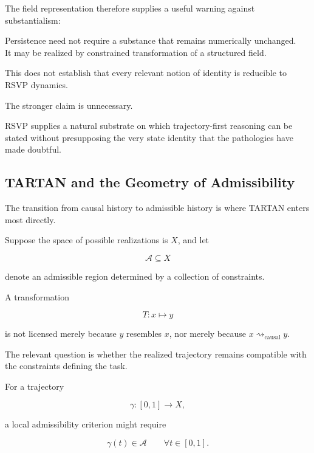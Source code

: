 \documentclass[
  11pt,
  a4paper,
  DIV=12,
  BCOR=0mm,
  parskip=half-
]{scrartcl}
\newcommand{\leadcausal}{%
  \mathrel{\rightsquigarrow_{\mathrm{causal}}}%
}
\theoremstyle{definition}
\theoremstyle{plain}
\theoremstyle{remark}
\begin{document}
The field representation therefore supplies a useful warning against
substantialism:

\begin{held}
\centering
Persistence need not require a substance that remains numerically unchanged.\\[3pt]
It may be realized by constrained transformation of a structured field.
\end{held}

This does not establish that every relevant notion of identity is reducible to
RSVP dynamics.

The stronger claim is unnecessary.

RSVP supplies a natural substrate on which trajectory-first reasoning can be
stated without presupposing the very state identity that the pathologies have
made doubtful.


\subsection{TARTAN and the Geometry of Admissibility}
\label{sec:tartan-admissibility}

The transition from causal history to admissible history is where TARTAN
enters most directly.

Suppose the space of possible realizations is \(X\), and let

\[
  \mathcal A\subseteq X
\]

denote an admissible region determined by a collection of constraints.

A transformation

\[
  T:x\mapsto y
\]

is not licensed merely because \(y\) resembles \(x\), nor merely because
\(x\leadcausal y\).

The relevant question is whether the realized trajectory remains compatible
with the constraints defining the task.

For a trajectory

\[
  \gamma:[0,1]\rightarrow X,
\]

a local admissibility criterion might require

\[
  \gamma(t)\in\mathcal A
  \qquad
  \forall t\in[0,1].
\]
\end{document}
